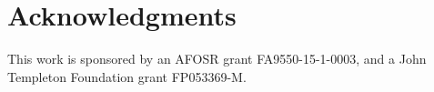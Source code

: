 \documentclass[reprint,twocolumn,showpacs,preprintnumbers,amsmath, aps,pre,amssymb]{revtex4-1}
\newcommand{\ignore}[1]{}
\begin{document}
\section{Acknowledgments}
This work is sponsored by an AFOSR grant FA9550-15-1-0003, and a John Templeton Foundation grant FP053369-M.




\ignore{
    \IncMargin{1em}
    \begin{algorithm}
    \SetAlgoLined
    
    \SetKwData{L}{$L$}
    \SetKwData{U}{$u$}
    \SetKwData{V}{$v$}
    \SetKwData{S}{$s$}
    \SetKwData{T}{$t$}
    \SetKwData{R}{$r$}
    \SetKwData{Sp}{$s^{\prime}$}
    \SetKwData{Tp}{$t^{\prime}$}
    \SetKwData{Rp}{$r^{\prime}$}
    \SetKwData{Rpneg}{$r^{\prime -1}$}
    \SetKwData{Rel}{$rel$}
    \SetKwData{G}{$\mathcal{G}$}
    \SetKwData{CurrentPath}{$P$}
    \SetKwData{Visited}{$S$}
    
    \SetKwFunction{E}{E}
    \SetKwFunction{Continue}{continue}
    \SetKwFunction{Append}{append}
    \SetKwFunction{Report}{report}
    \SetKwFunction{Return}{return}
    \SetKwFunction{Len}{length}
    \SetKwFunction{This}{searchPredicatePath}
    
    \SetKwInOut{Input}{input}\SetKwInOut{Output}{output}
    \SetKwInOut{Global}{global}
    \Global{network \G, RDF triple (\U,\V,\Rel), path-length constraint \L}
    \Input{current RDF triple (\S, \T, \R), current path \CurrentPath, visited nodes \Visited}
    \Output{predicate path \CurrentPath}
    
    \BlankLine
    
    \If{\Len{\CurrentPath} $\geq$ \L or \T in \Visited}{
        \Return \tcp*[r]{self-loop or exceed max length}
    }
    
    \Append{\CurrentPath, \R}\;
    \Append{\Visited, \T}\;
    \BlankLine
    
    \If{\S == \V}{
        \Report \CurrentPath \tcp*[r]{find a predicate path}
        \Return \;
    }
    \BlankLine
    
    \ForEach{ $(\T,\Tp,\Rp) \in \E{\G}$}{
        \tcp{construct path with out-going edges}
        \eIf{\T in \CurrentPath}{
            \Continue\;
        }{
            \This{\T,\Tp,\Rp, \CurrentPath, \Visited}\;
        }
    }
    
    \ForEach{ $(\T,\Tp,\Rpneg) \in \E{\G}$}{
        \tcp{construct path with in-coming edges}
        \eIf{\T in \CurrentPath}{
            \Continue\;
        }{
            \This{\T,\Tp,\Rpneg, \CurrentPath, \Visited}\;
        }
    }
    

\end{algorithm}}
\end{document}
